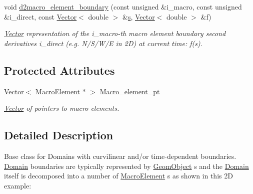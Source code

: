 \begin{DoxyCompactItemize}
void \hyperlink{classoomph_1_1Domain_a837d82e917451ca9adc755aa99ad99a2}{d2macro\+\_\+element\+\_\+boundary} (const unsigned \&i\+\_\+macro, const unsigned \&i\+\_\+direct, const \hyperlink{classoomph_1_1Vector}{Vector}$<$ double $>$ \&\hyperlink{cfortran_8h_ab7123126e4885ef647dd9c6e3807a21c}{s}, \hyperlink{classoomph_1_1Vector}{Vector}$<$ double $>$ \&f)
\begin{DoxyCompactList}\small\item\em \hyperlink{classoomph_1_1Vector}{Vector} representation of the i\+\_\+macro-\/th macro element boundary second derivatives i\+\_\+direct (e.\+g. N/\+S/\+W/E in 2D) at current time\+: f(s). \end{DoxyCompactList}\end{DoxyCompactItemize}
\subsection*{Protected Attributes}
\begin{DoxyCompactItemize}
\item 
\hyperlink{classoomph_1_1Vector}{Vector}$<$ \hyperlink{classoomph_1_1MacroElement}{Macro\+Element} $\ast$ $>$ \hyperlink{classoomph_1_1Domain_a3a54693bb493f31acccadc62468dd7ae}{Macro\+\_\+element\+\_\+pt}
\begin{DoxyCompactList}\small\item\em \hyperlink{classoomph_1_1Vector}{Vector} of pointers to macro elements. \end{DoxyCompactList}\end{DoxyCompactItemize}


\subsection{Detailed Description}
Base class for Domains with curvilinear and/or time-\/dependent boundaries. \hyperlink{classoomph_1_1Domain}{Domain} boundaries are typically represented by \hyperlink{classoomph_1_1GeomObject}{Geom\+Object} s and the \hyperlink{classoomph_1_1Domain}{Domain} itself is decomposed into a number of \hyperlink{classoomph_1_1MacroElement}{Macro\+Element} s as shown in this 2D example\+: 

